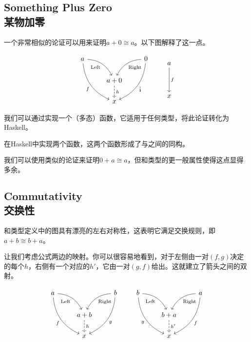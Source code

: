\documentclass[DaoFP]{subfiles}
\begin{document}
 \subsection{Something Plus Zero\\某物加零}

 一个非常相似的论证可以用来证明$a + 0 \cong a$。以下图解释了这一点。

 \[
  \begin{tikzcd}
   a
   \arrow[dr,  bend left, "\text{Left}"']
   \arrow[ddr, bend right, "f"']
   && 0
   \arrow[dl, bend right, "\text{Right}"]
   \arrow[ddl, bend left, "\mbox{!`}"]
   \\
   &a + 0
   \arrow[d, dashed, "h"]
   \\
   & x
  \end{tikzcd}
  \qquad
  \begin{tikzcd}
   a
   \arrow[dd, "f"]
   \\
   \\
   x
  \end{tikzcd}
 \]

 我们可以通过实现一个（多态）函数，它适用于任何类型，将此论证转化为Haskell。

 \begin{exercise}
  在Haskell中实现两个函数，这两个函数形成了与之间的同构。
 \end{exercise}

 我们可以使用类似的论证来证明$0 + a \cong a$，但和类型的更一般属性使得这点显得多余。
 \subsection{Commutativity\\交换性}

 和类型定义中的图具有漂亮的左右对称性，这表明它满足交换规则，即$a + b \cong b + a$。

 让我们考虑公式两边的映射。你可以很容易地看到，对于左侧由一对$(f, g)$决定的每个$h$，右侧有一个对应的$h'$，它由一对$(g, f)$给出。这就建立了箭头之间的双射。

 \[
  \begin{tikzcd}
   a
   \arrow[dr,  bend left, "\text{Left}"']
   \arrow[ddr, bend right, "f"']
   && b
   \arrow[dl, bend right, "\text{Right}"]
   \arrow[ddl, bend left, "g"]
   \\
   &a + b
   \arrow[d, dashed, "h"]
   \\
   & x
  \end{tikzcd}
  \qquad
  \begin{tikzcd}
   b
   \arrow[dr,  bend left, "\text{Left}"']
   \arrow[ddr, bend right, "g"']
   && a
   \arrow[dl, bend right, "\text{Right}"]
   \arrow[ddl, bend left, "f"]
   \\
   &b + a
   \arrow[d, dashed, "h'"]
   \\
   & x
  \end{tikzcd}
 \]
\end{document}
